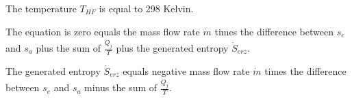 The temperature \( T_{HF} \) is equal to 298 Kelvin.

The equation is zero equals the mass flow rate \( \dot{m} \) times the difference between \( s_e \) and \( s_a \) plus the sum of \( \frac{\dot{Q}_j}{T} \) plus the generated entropy \( \dot{S}_{erz} \).

The generated entropy \( \dot{S}_{erz} \) equals negative mass flow rate \( \dot{m} \) times the difference between \( s_e \) and \( s_a \) minus the sum of \( \frac{\dot{Q}_j}{T} \).